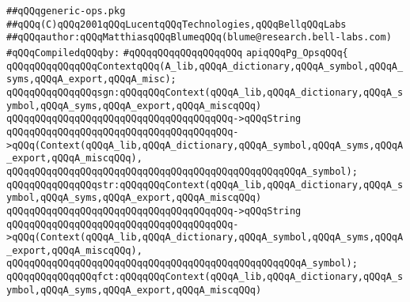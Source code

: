 \label{src/app/makelib/portable-graph/generic-ops.pkg}
\verb|##qQQqgeneric-ops.pkg|\newline
\verb|##qQQq(C)qQQq2001qQQqLucentqQQqTechnologies,qQQqBellqQQqLabs|\newline
\verb|##qQQqauthor:qQQqMatthiasqQQqBlumeqQQq(blume@research.bell-labs.com)|\newline
\newline
\verb|#qQQqCompiledqQQqby:|\newline
\verb|#qQQqqQQqqQQqqQQqqQQq|\newline
\newline
\newline
\newline
\verb|apiqQQqPg_OpsqQQq{|\newline
\newline
\verb|qQQqqQQqqQQqqQQqContextqQQq(A_lib,qQQqA_dictionary,qQQqA_symbol,qQQqA_syms,qQQqA_export,qQQqA_misc);|\newline
\newline
\verb|qQQqqQQqqQQqqQQqsgn:qQQqqQQqContext(qQQqA_lib,qQQqA_dictionary,qQQqA_symbol,qQQqA_syms,qQQqA_export,qQQqA_miscqQQq)|\newline
\verb|qQQqqQQqqQQqqQQqqQQqqQQqqQQqqQQqqQQqqQQq->qQQqString|\newline
\verb|qQQqqQQqqQQqqQQqqQQqqQQqqQQqqQQqqQQqqQQq->qQQq(Context(qQQqA_lib,qQQqA_dictionary,qQQqA_symbol,qQQqA_syms,qQQqA_export,qQQqA_miscqQQq),|\newline
\verb|qQQqqQQqqQQqqQQqqQQqqQQqqQQqqQQqqQQqqQQqqQQqqQQqqQQqA_symbol);|\newline
\newline
\verb|qQQqqQQqqQQqqQQqstr:qQQqqQQqContext(qQQqA_lib,qQQqA_dictionary,qQQqA_symbol,qQQqA_syms,qQQqA_export,qQQqA_miscqQQq)|\newline
\verb|qQQqqQQqqQQqqQQqqQQqqQQqqQQqqQQqqQQqqQQq->qQQqString|\newline
\verb|qQQqqQQqqQQqqQQqqQQqqQQqqQQqqQQqqQQqqQQq->qQQq(Context(qQQqA_lib,qQQqA_dictionary,qQQqA_symbol,qQQqA_syms,qQQqA_export,qQQqA_miscqQQq),|\newline
\verb|qQQqqQQqqQQqqQQqqQQqqQQqqQQqqQQqqQQqqQQqqQQqqQQqqQQqA_symbol);|\newline
\newline
\verb|qQQqqQQqqQQqqQQqfct:qQQqqQQqContext(qQQqA_lib,qQQqA_dictionary,qQQqA_symbol,qQQqA_syms,qQQqA_export,qQQqA_miscqQQq)|\newline
